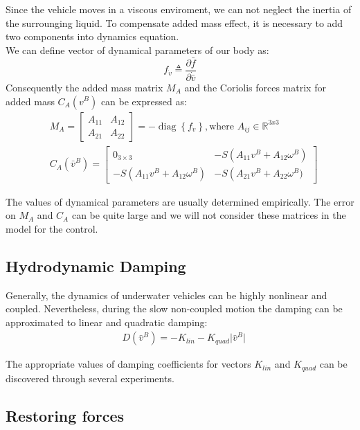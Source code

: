     Since the vehicle moves in a viscous enviroment, we can not neglect the inertia of the surrounging liquid.
    To compensate added mass effect, it is necessary to add two components into dynamics equation.\\
    We can define vector of dynamical parameters of our body as:
    $$
    f_{\dot{v}} \triangleq \frac{\partial \bar{f}}{\partial \dot{\bar{v}}}
    $$
    Consequently the added mass matrix $M_A$ and 
    the Coriolis forces matrix for added mass $C_A(v^B)$
    can be expressed as: 
    $$
    \begin{aligned}
        & M_A=\left[\begin{array}{cc}
            A_{11} & A_{12} \\
            A_{21} & A_{22}
            \end{array}\right]=-\operatorname{diag}\left\{f_{\dot{v}}\right\}, \textrm{where } A_{ij} \in \mathbb{R}^{3 x 3} \\
        & C_A(\bar{v}^B)=\left[\begin{array}{cc}
        0_{3 \times 3} & -S\left(A_{11} v^B+A_{12} \omega^B\right) \\
        -S\left(A_{11} v^B+A_{12} \omega^B\right) & -S\left(A_{21} v^B+A_{22} \omega^B)\right.
        \end{array}\right]
    \end{aligned}
    $$

    The values of dynamical parameters are usually determined
    empirically. The error on $M_A$ and $C_A$ can be quite large and we will not consider
    these matrices in the model for the control.

\subsection{Hydrodynamic Damping}

    Generally, the dynamics of underwater vehicles can be highly nonlinear and coupled.
    Nevertheless, during the slow non-coupled motion the damping can be approximated to linear and quadratic damping:
    $$\begin{aligned}
        & D(\bar{v}^B)=-K_{lin} - K_{quad}\lvert \bar{v}^B \rvert
    \end{aligned}
    $$

    The appropriate values of damping coefficients for vectors $K_{lin}$ and $K_{quad}$ can be discovered through several experiments.

\subsection{Restoring forces}

